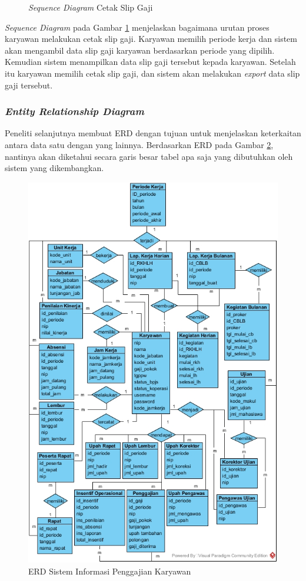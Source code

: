 \begin{enumerate}
\begin{figure}[H]
            		    \caption{\emph{Sequence Diagram} Cetak Slip Gaji}
            		    \label{sequence_cetak_slip}
            		\end{figure}
            		\emph{Sequence Diagram} pada Gambar \ref{sequence_cetak_slip} menjelaskan bagaimana urutan proses karyawan melakukan cetak slip gaji. Karyawan memilih periode kerja dan sistem akan mengambil data slip gaji karyawan berdasarkan periode yang dipilih. Kemudian sistem menampilkan data slip gaji tersebut kepada karyawan. Setelah itu karyawan memilih cetak slip gaji, dan sistem akan melakukan \emph{export} data slip gaji tersebut.
			\end{enumerate}
			
			\subsubsection{\emph{Entity Relationship Diagram}}
			Peneliti selanjutnya membuat ERD dengan tujuan untuk menjelaskan keterkaitan antara data satu dengan yang lainnya. Berdasarkan ERD pada Gambar \ref{erd_penggajian}, nantinya akan diketahui secara garis besar tabel apa saja yang dibutuhkan oleh sistem yang dikembangkan.
			\newpage
			\begin{figure}[H]
			    \centering
			    \includegraphics[width=14cm]{gambar/entity/ERD-versi3}
			    \caption{ERD Sistem Informasi Penggajian Karyawan}
			    \label{erd_penggajian}
			\end{figure}

